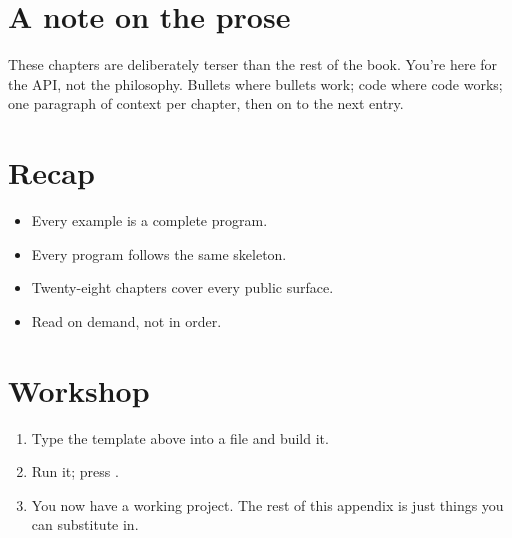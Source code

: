 \section{A note on the prose}

These chapters are deliberately terser than the rest of the
book. You're here for the API, not the philosophy. Bullets
where bullets work; code where code works; one paragraph
of context per chapter, then on to the next entry.

\section{Recap}

\begin{recap}
\begin{itemize}[leftmargin=*]
  \item Every example is a complete program.
  \item Every program follows the same skeleton.
  \item Twenty-eight chapters cover every public surface.
  \item Read on demand, not in order.
\end{itemize}
\end{recap}

\section*{Workshop}

\begin{enumerate}[leftmargin=*]
  \item Type the template above into a file and build it.
  \item Run it; press .
  \item You now have a working \maya{} project. The rest of
    this appendix is just things you can substitute in.
\end{enumerate}
